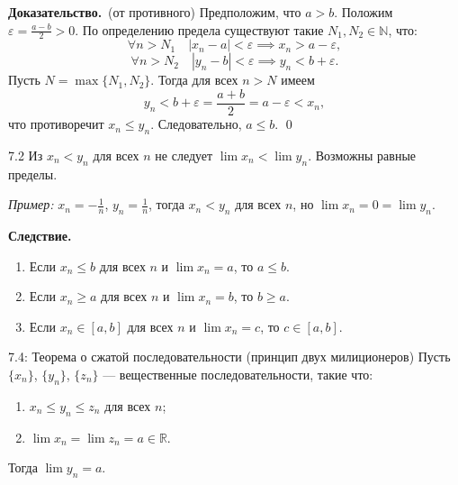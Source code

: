 \documentclass[a4paper,12pt]{article}
\newcommand{\myproof}{\textbf{Доказательство.}\ }
\newcommand{\mycorollary}{\textbf{Следствие.}\ }
\begin{document}
	\myproof (от противного)
	Предположим, что $a > b$. Положим $\varepsilon = \frac{a-b}{2} > 0$.
	По определению предела существуют такие $N_1, N_2 \in \mathbb{N}$, что:
	\[
	\forall n > N_1 \quad |x_n - a| < \varepsilon \implies x_n > a - \varepsilon,
	\]
	\[
	\forall n > N_2 \quad |y_n - b| < \varepsilon \implies y_n < b + \varepsilon.
	\]
	Пусть $N = \max\{N_1, N_2\}$. Тогда для всех $n > N$ имеем
	\[
	y_n < b + \varepsilon = \frac{a+b}{2} = a - \varepsilon < x_n,
	\]
	что противоречит $x_n \le y_n$. Следовательно, $a \le b$. \qed
	
	\begin{remarkbox}{7.2}
		Из $x_n < y_n$ для всех $n$ не следует $\lim x_n < \lim y_n$. Возможны равные пределы.
		
		\textit{Пример:} $x_n = -\frac{1}{n}$, $y_n = \frac{1}{n}$, тогда $x_n < y_n$ для всех $n$, но $\lim x_n = 0 = \lim y_n$.
	\end{remarkbox}
	
	\mycorollary
	\begin{enumerate}
		\item Если $x_n \le b$ для всех $n$ и $\lim x_n = a$, то $a \le b$.
		\item Если $x_n \ge a$ для всех $n$ и $\lim x_n = b$, то $b \ge a$.
		\item Если $x_n \in [a, b]$ для всех $n$ и $\lim x_n = c$, то $c \in [a, b]$.
	\end{enumerate}
	
	\begin{center}
	\end{center}
	
	\begin{theorembox}{7.4: Теорема о сжатой последовательности (принцип двух милиционеров)}
		Пусть $\{x_n\}$, $\{y_n\}$, $\{z_n\}$ — вещественные последовательности, такие что:
		\begin{enumerate}
			\item $x_n \le y_n \le z_n$ для всех $n$;
			\item $\lim x_n = \lim z_n = a \in \mathbb{R}$.
		\end{enumerate}
		Тогда $\lim y_n = a$.
	\end{theorembox}
	
\end{document}
